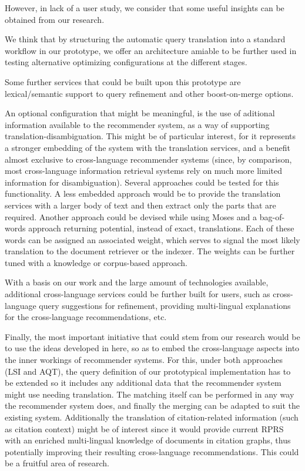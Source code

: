 \documentclass{llncs}
\begin{document}
However, in lack of a user study, we consider that some useful insights can be obtained from our research. 

We think that by structuring the automatic query translation into a standard workflow in our prototype, we offer an architecture amiable to be further used in testing alternative optimizing configurations at the different stages.

Some further services that could be built upon this prototype are lexical/semantic support to query refinement and other boost-on-merge options. 

An optional configuration that might be meaningful, is the use of aditional information available to the recommender system, as a way of supporting translation-disambiguation. This might be of particular interest, for it represents a stronger embedding of the system with the translation services, and a benefit almost exclusive to cross-language recommender systems (since, by comparison, most cross-language information retrieval systems rely on much more limited information for disambiguation). Several approaches could be tested for this functionality. A less embedded approach would be to provide the translation services with a larger body of text and then extract only the parts that are required. Another approach could be devised while using Moses and a bag-of-words approach returning potential, instead of exact, translations. Each of these words can be assigned an associated weight, which serves to signal the most likely translation to the document retriever or the indexer. The weights can be further tuned with a knowledge or corpus-based approach.

With a basis on our work and the large amount of technologies available, additional cross-language services could be further built for users, such as cross-language query suggestions for refinement, providing multi-lingual explanations for the cross-language recommendations, etc.

Finally, the most important initiative that could stem from our research would be to use the ideas developed in here, so as to embed the cross-language aspects into the inner workings of recommender systems. For this, under both approaches (LSI and AQT), the query definition of our prototypical implementation has to be extended so it includes any additional data that the recommender system might use needing translation. The matching itself can be performed in any way the recommender system does, and finally the merging can be adapted to suit the existing system. Additionally the translation of citation-related information (such as citation context) might be of interest since it would provide current RPRS with an enriched multi-lingual knowledge of documents in citation graphs, thus potentially improving their resulting cross-language recommendations. This could be a fruitful area of research.
\end{document}
